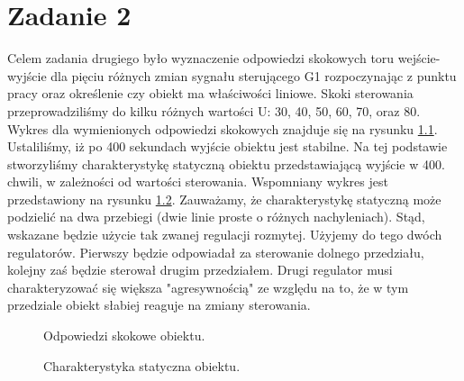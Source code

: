 \chapter{Zadanie 2}
Celem zadania drugiego było wyznaczenie odpowiedzi skokowych toru wejście-wyjście dla pięciu
różnych zmian sygnału sterującego G1 rozpoczynając z punktu pracy oraz określenie czy
obiekt ma właściwości liniowe. Skoki sterowania przeprowadziliśmy do
kilku różnych wartości U: 30, 40, 50, 60, 70, oraz 80. Wykres dla wymienionych odpowiedzi skokowych
znajduje się na rysunku \ref{fig:skoki}. Ustaliliśmy, iż po 400 sekundach wyjście obiektu jest
stabilne. Na tej podstawie stworzyliśmy charakterystykę statyczną obiektu przedstawiającą
wyjście w 400. chwili, w zależności od wartości sterowania. Wspomniany wykres jest
przedstawiony na rysunku \ref{fig:char_stat}.
Zauważamy, że charakterystykę statyczną może podzielić na dwa przebiegi (dwie linie proste
o różnych nachyleniach). Stąd, wskazane będzie użycie tak zwanej regulacji rozmytej. Użyjemy
do tego dwóch regulatorów. Pierwszy będzie odpowiadał za sterowanie dolnego przedziału, kolejny zaś
będzie sterował drugim przedziałem. Drugi regulator musi charakteryzować się większa "agresywnością"
ze względu na to, że w tym przedziale obiekt słabiej reaguje na zmiany sterowania.

\begin{figure}[tb]
\centering
{}
\caption{Odpowiedzi skokowe obiektu.}
\label{fig:skoki}
\end{figure}

\begin{figure}[tb]
\centering
{}
\caption{Charakterystyka statyczna obiektu.}
\label{fig:char_stat}
\end{figure}
